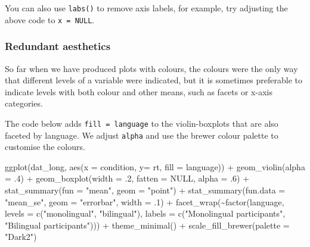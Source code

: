 \documentclass[
  english,
  doc,floatsintext]{apa6}
\newenvironment{Shaded}{\begin{snugshade}}{\end{snugshade}}
\newcommand{\AttributeTok}[1]{\textcolor[rgb]{0.77,0.63,0.00}{#1}}
\newcommand{\ConstantTok}[1]{\textcolor[rgb]{0.00,0.00,0.00}{#1}}
\newcommand{\DecValTok}[1]{\textcolor[rgb]{0.00,0.00,0.81}{#1}}
\newcommand{\FunctionTok}[1]{\textcolor[rgb]{0.00,0.00,0.00}{#1}}
\newcommand{\NormalTok}[1]{#1}
\newcommand{\SpecialCharTok}[1]{\textcolor[rgb]{0.00,0.00,0.00}{#1}}
\newcommand{\StringTok}[1]{\textcolor[rgb]{0.31,0.60,0.02}{#1}}
\begin{document}
You can also use \texttt{labs()} to remove axis labels, for example, try adjusting the above code to \texttt{x\ =\ NULL}.

\hypertarget{redundant-aesthetics}{%
\subsubsection{Redundant aesthetics}\label{redundant-aesthetics}}

So far when we have produced plots with colours, the colours were the only way that different levels of a variable were indicated, but it is sometimes preferable to indicate levels with both colour and other means, such as facets or x-axis categories.

The code below adds \texttt{fill\ =\ language} to the violin-boxplots that are also faceted by language. We adjust \texttt{alpha} and use the brewer colour palette to customise the colours.

\begin{Shaded}
\begin{Highlighting}[]
\FunctionTok{ggplot}\NormalTok{(dat\_long, }\FunctionTok{aes}\NormalTok{(}\AttributeTok{x =}\NormalTok{ condition, }\AttributeTok{y=}\NormalTok{ rt, }\AttributeTok{fill =}\NormalTok{ language)) }\SpecialCharTok{+}
  \FunctionTok{geom\_violin}\NormalTok{(}\AttributeTok{alpha =}\NormalTok{ .}\DecValTok{4}\NormalTok{) }\SpecialCharTok{+}
  \FunctionTok{geom\_boxplot}\NormalTok{(}\AttributeTok{width =}\NormalTok{ .}\DecValTok{2}\NormalTok{, }\AttributeTok{fatten =} \ConstantTok{NULL}\NormalTok{, }\AttributeTok{alpha =}\NormalTok{ .}\DecValTok{6}\NormalTok{) }\SpecialCharTok{+}
  \FunctionTok{stat\_summary}\NormalTok{(}\AttributeTok{fun =} \StringTok{"mean"}\NormalTok{, }\AttributeTok{geom =} \StringTok{"point"}\NormalTok{) }\SpecialCharTok{+}
  \FunctionTok{stat\_summary}\NormalTok{(}\AttributeTok{fun.data =} \StringTok{"mean\_se"}\NormalTok{, }\AttributeTok{geom =} \StringTok{"errorbar"}\NormalTok{, }\AttributeTok{width =}\NormalTok{ .}\DecValTok{1}\NormalTok{) }\SpecialCharTok{+}
  \FunctionTok{facet\_wrap}\NormalTok{(}\SpecialCharTok{\textasciitilde{}}\FunctionTok{factor}\NormalTok{(language, }
                     \AttributeTok{levels =} \FunctionTok{c}\NormalTok{(}\StringTok{"monolingual"}\NormalTok{, }\StringTok{"bilingual"}\NormalTok{),}
                     \AttributeTok{labels =} \FunctionTok{c}\NormalTok{(}\StringTok{"Monolingual participants"}\NormalTok{, }
                                \StringTok{"Bilingual participants"}\NormalTok{))) }\SpecialCharTok{+}
  \FunctionTok{theme\_minimal}\NormalTok{() }\SpecialCharTok{+}
  \FunctionTok{scale\_fill\_brewer}\NormalTok{(}\AttributeTok{palette =} \StringTok{"Dark2"}\NormalTok{)}
\end{Highlighting}
\end{Shaded}
\end{document}
